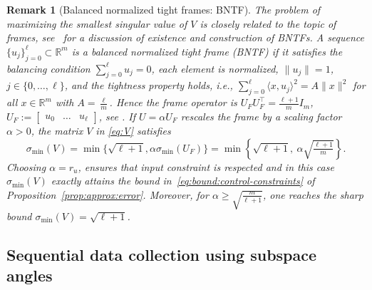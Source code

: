 \documentclass[a4paper, reqno]{amsart}
\newcommand{\dd}{\ell}
\newtheorem{remark}[theorem]{Remark}
\begin{document}
\begin{remark}[Balanced normalized tight frames: BNTF]
    The problem of maximizing the smallest singular value of $V$ is closely related to the topic of frames, see~\cite{heineken2020balanced} for a discussion of existence and construction of BNTFs.
    A sequence $\{u_j\}_{j=0}^{\dd}\subset \mathbb R^m$ is a balanced normalized tight frame (BNTF) if it satisfies the balancing condition $\sum_{j=0}^{\dd} u_j = 0$, each element is normalized, $\lVert u_j\rVert=1$, $j\in\lbrace0,\dots,\dd\rbrace$, and the tightness property holds, i.e., $\sum_{j=0}^{\dd} \langle x,u_j\rangle^2 = A\lVert x\rVert^2$ for all $x\in\mathbb R^m$ with $A=\frac{\dd}{m}$. Hence the frame operator is $U_FU_F^\top = \frac{\dd+1}{m} I_{m}$, $U_F:=\begin{bmatrix}u_0 & \dots & u_{\dd}\end{bmatrix}$, see \cite[Theorems~2.1,~3.1]{benedetto2003finite}. If $U=\alpha U_F$ rescales the frame by a scaling factor $\alpha>0$, the matrix $V$ in \eqref{eq:V} satisfies
    \begin{equation*}
        \sigma_\mathrm{min}(V) = \min\{\sqrt{\dd+1}, \alpha\sigma_\mathrm{min}(U_F)\} = \min\!\left\lbrace\!\sqrt{\dd+1},\ \alpha\sqrt{\tfrac{\dd+1}{m}}\right\rbrace.
    \end{equation*}
    Choosing $\alpha=r_u$, ensures that input constraint is respected and in this case $\sigma_\mathrm{min}(V)$ exactly attains the bound in~\eqref{eq:bound:control-constraints} of Proposition~\ref{prop:approx:error}. 
    Moreover, for $\alpha \geq \sqrt{\tfrac{m}{\dd+1}}$, one reaches the sharp bound $\sigma_\mathrm{min}(V)=\sqrt{\dd+1}$.
\end{remark}





\subsection{Sequential data collection using subspace angles} 
\label{sec:excitation:efficient}
\end{document}

